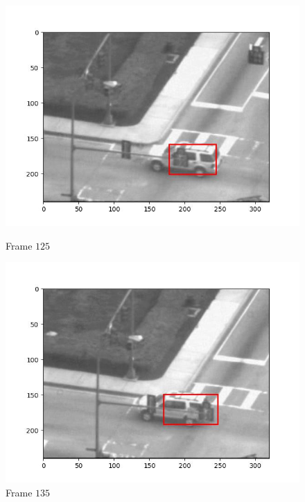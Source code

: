 \begin{figure}[H]
  \centering
  \begin{minipage}{.49\textwidth}
    \centering
    \includegraphics[width=\textwidth]{./figures/lk_affine/car2/frame000125.jpg}
    \caption{Frame $125$}
  \end{minipage}
  \hfill
  \begin{minipage}{.49\textwidth}
    \centering
    \includegraphics[width=\textwidth]{./figures/lk_affine/car2/frame000135.jpg}
    \caption{Frame $135$}
  \end{minipage}
  \hfill
  \begin{minipage}{.49\textwidth}
    \centering

\end{minipage}
\end{figure}
